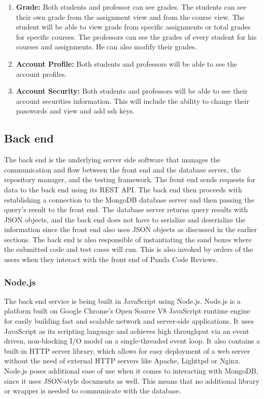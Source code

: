 \begin{enumerate}
\item \textbf{Grade:} Both students and professor can see grades. The students
can see their own grade from the assignment view and from the course view. The
student will be able to view grade from specific assignments or total grades for
specific courses. The professors can see the grades of every student for his
courses and assignments. He can also modify their grades.

\item \textbf{Account Profile:} Both students and professors will be able to see
the account profiles.

\item \textbf{Account Security:} Both students and professors will be able to
see their account securities information. This will include the ability to
change their passwords and view and add ssh keys.


\end{enumerate}

\subsection{Back end}

The back end is the underlying server side software that manages the
communication and flow between the front end and the database server, the
repository manager, and the testing framework. The front end sends requests for
data to the back end using its REST API. The back end then proceeds with
establishing a connection to the MongoDB database server and then passing the
query's result to the front end. The database server returns query results with
JSON objects, and the back end does not have to serialize and deserialize the
information since the front end also uses JSON objects as discussed in the
earlier sections. The back end is also responsible of instantiating the sand
boxes where the submitted code and test cases will run. This is also invoked by
orders of the users when they interact with the front end of Panda Code Reviews.

\subsubsection{Node.js}

The back end service is being built in JavaScript using Node.js. Node.js is a
platform built on Google Chrome's Open Source V8 JavaScript runtime engine for
easily building fast and scalable network and server-side applications. It uses
JavaScript as its scripting language and achieves high throughput via an event
driven, non-blocking I/O model on a single-threaded event loop. It also contains
a built-in HTTP server library, which allows for easy deployment of a web server
without the need of external HTTP servers like Apache, Lighttpd or Nginx.
Node.js poses additional ease of use when it comes to interacting with MongoDB,
since it uses JSON-style documents as well. This means that no additional
library or wrapper is needed to communicate with the database.

